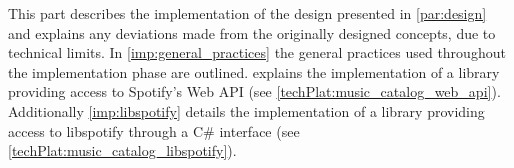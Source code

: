 This part describes the implementation of the design presented in \cref{par:design} and explains any deviations made from the originally designed concepts, due to technical limits. In \cref{imp:general_practices} the general practices used throughout the implementation phase are outlined.  explains the implementation of a library providing access to Spotify's Web API (see \cref{techPlat:music_catalog_web_api}). Additionally \cref{imp:libspotify} details the implementation of a library providing access to libspotify through a C\# interface (see \cref{techPlat:music_catalog_libspotify}).
